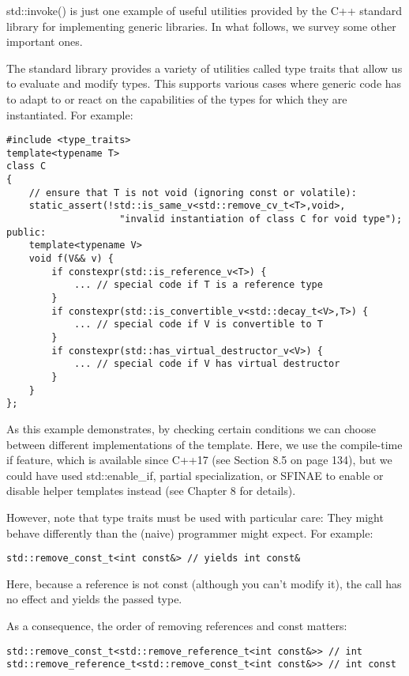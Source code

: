 
std::invoke() is just one example of useful utilities provided by the C++ standard library for implementing generic libraries. In what follows, we survey some other important ones.


The standard library provides a variety of utilities called type traits that allow us to evaluate and modify types. This supports various cases where generic code has to adapt to or react on the capabilities of the types for which they are instantiated. For example:

\begin{lstlisting}[style=styleCXX]
#include <type_traits>
template<typename T>
class C
{
	// ensure that T is not void (ignoring const or volatile):
	static_assert(!std::is_same_v<std::remove_cv_t<T>,void>,
					"invalid instantiation of class C for void type");
public:
	template<typename V>
	void f(V&& v) {
		if constexpr(std::is_reference_v<T>) {
			... // special code if T is a reference type
		}
		if constexpr(std::is_convertible_v<std::decay_t<V>,T>) {
			... // special code if V is convertible to T
		}
		if constexpr(std::has_virtual_destructor_v<V>) {
			... // special code if V has virtual destructor
		}
	}
};
\end{lstlisting}

As this example demonstrates, by checking certain conditions we can choose between different implementations of the template. Here, we use the compile-time if feature, which is available since C++17 (see Section 8.5 on page 134), but we could have used std::enable\_if, partial specialization, or SFINAE to enable or disable helper templates instead (see Chapter 8 for details).

However, note that type traits must be used with particular care: They might behave differently than the (naive) programmer might expect. For example:

\begin{lstlisting}[style=styleCXX]
std::remove_const_t<int const&> // yields int const&
\end{lstlisting}

Here, because a reference is not const (although you can’t modify it), the call has no effect and yields the passed type.

As a consequence, the order of removing references and const matters:

\begin{lstlisting}[style=styleCXX]
std::remove_const_t<std::remove_reference_t<int const&>> // int
std::remove_reference_t<std::remove_const_t<int const&>> // int const
\end{lstlisting}

